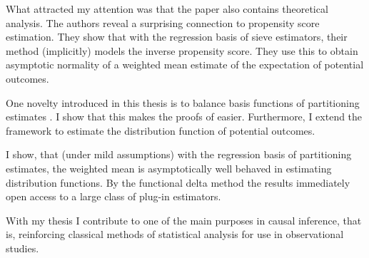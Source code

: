 What attracted my attention was that
the paper \cite{Wang2019} also contains theoretical analysis.
The authors reveal a surprising connection to propensity score estimation.
They show that with the regression basis of sieve estimators\cite{Newey1997a}, their method (implicitly) models the inverse propensity score.
They use this to obtain asymptotic normality of a weighted mean estimate of the expectation of potential outcomes.

One novelty introduced in this thesis is to balance basis functions of partitioning estimates \cite{Gyorfi2002}.
I show that this makes the proofs of \cite{Wang2019} easier.
Furthermore, I extend the framework to estimate the distribution function of potential outcomes.

I show, that (under mild assumptions) with the regression basis of partitioning estimates, the weighted mean is asymptotically well behaved in estimating distribution functions.
By the functional delta method
\cite{Vaart2000} the results immediately open access to a large class of plug-in estimators.

With my thesis I contribute to one of the main purposes in causal inference, that is, reinforcing classical methods of statistical analysis for use in observational studies.



